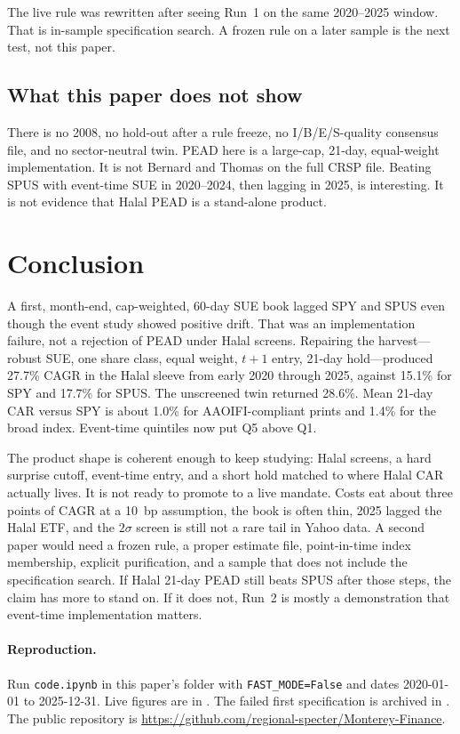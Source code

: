 \documentclass[11pt,letterpaper]{article}
\begin{document}
The live rule was rewritten after seeing Run~1 on the same 2020--2025 window. That is in-sample specification search. A frozen rule on a later sample is the next test, not this paper.

\subsection{What this paper does not show}

There is no 2008, no hold-out after a rule freeze, no I/B/E/S-quality consensus file, and no sector-neutral twin. PEAD here is a large-cap, 21-day, equal-weight implementation. It is not Bernard and Thomas on the full CRSP file. Beating SPUS with event-time SUE in 2020--2024, then lagging in 2025, is interesting. It is not evidence that Halal PEAD is a stand-alone product.

\section{Conclusion}
\label{sec:conc}

A first, month-end, cap-weighted, 60-day SUE book lagged SPY and SPUS even though the event study showed positive drift. That was an implementation failure, not a rejection of PEAD under Halal screens. Repairing the harvest---robust SUE, one share class, equal weight, $t+1$ entry, 21-day hold---produced 27.7\% CAGR in the Halal sleeve from early 2020 through 2025, against 15.1\% for SPY and 17.7\% for SPUS. The unscreened twin returned 28.6\%. Mean 21-day CAR versus SPY is about 1.0\% for AAOIFI-compliant prints and 1.4\% for the broad index. Event-time quintiles now put Q5 above Q1.

The product shape is coherent enough to keep studying: Halal screens, a hard surprise cutoff, event-time entry, and a short hold matched to where Halal CAR actually lives. It is not ready to promote to a live mandate. Costs eat about three points of CAGR at a 10~bp assumption, the book is often thin, 2025 lagged the Halal ETF, and the $2\sigma$ screen is still not a rare tail in Yahoo data. A second paper would need a frozen rule, a proper estimate file, point-in-time index membership, explicit purification, and a sample that does not include the specification search. If Halal 21-day PEAD still beats SPUS after those steps, the claim has more to stand on. If it does not, Run~2 is mostly a demonstration that event-time implementation matters.

\paragraph{Reproduction.}
Run \texttt{code.ipynb} in this paper's folder with \texttt{FAST\_MODE=False} and dates 2020-01-01 to 2025-12-31. Live figures are in . The failed first specification is archived in . The public repository is \url{https://github.com/regional-specter/Monterey-Finance}.
\end{document}
